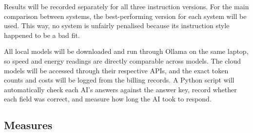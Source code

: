 Results will be recorded separately for all three instruction versions. For the main comparison between systems, the best-performing version for each system will be used. This way, no system is unfairly penalised because its instruction style happened to be a bad fit.

All local models will be downloaded and run through Ollama \cite{ollama_2024} on the same laptop, so speed and energy readings are directly comparable across models. The cloud models will be accessed through their respective APIs, and the exact token counts and costs will be logged from the billing records. A Python script will automatically check each AI's answers against the answer key, record whether each field was correct, and measure how long the AI took to respond.

\subsection{Measures}

